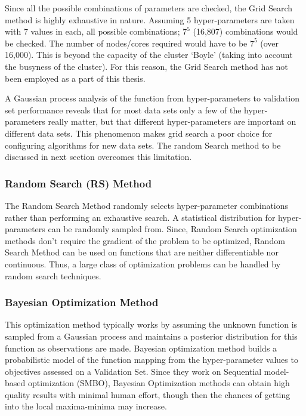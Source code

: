 Since all the possible combinations of parameters are checked, the Grid Search method is highly exhaustive in nature. Assuming 5 hyper-parameters are taken with 7 values in each, all possible combinations; $7^5$ (16,807) combinations would be checked. The number of nodes/cores required would have to be $7^5$ (over 16,000). This is beyond the capacity of the cluster ‘Boyle’ (taking into account the busyness of the cluster). For this reason, the Grid Search method has not been employed as a part of this thesis.

A Gaussian process analysis of the function from hyper-parameters to validation set performance reveals that for most data sets only a few of the hyper-parameters really matter, but that different hyper-parameters are important on different data sets. This phenomenon makes grid search a poor choice for configuring algorithms for new data sets\cite{bergstra2012random}. The random Search method to be discussed in next section overcomes this limitation.


\subsubsection{Random Search (RS) Method}
The Random Search Method randomly selects hyper-parameter combinations rather than performing an exhaustive search. A statistical distribution for hyper-parameters can be randomly sampled from. Since, Random Search optimization methods don’t require the gradient of the problem to be optimized, Random Search Method can be used on functions that are neither differentiable nor continuous. Thus, a large class of optimization problems can be handled by random search techniques\cite{solis1981minimization}. 

\subsubsection{Bayesian Optimization Method}

This optimization method typically works by assuming the unknown function is sampled from a Gaussian process and maintains a posterior distribution for this function as observations are made\cite{snoek2012practical}. Bayesian optimization method builds a probabilistic model of the function mapping from the hyper-parameter values to objectives assessed on a Validation Set. Since they work on Sequential model-based optimization (SMBO), Bayesian Optimization methods can obtain high quality results with minimal human effort, though then the chances of getting into the local maxima-minima may increase.

